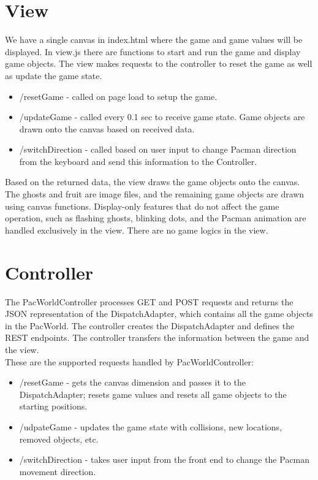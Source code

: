 \documentclass[letterpaper, 11pt]{article}
\begin{document}
\section{View}
We have a single canvas in index.html where the game and game values will be displayed. In view.js there are functions to start and run the game and display game objects. The view makes requests to the controller to reset the game as well as update the game state. 

\begin{itemize}
  \item /resetGame - called on page load to setup the game.
  \item /updateGame - called every 0.1 sec to receive game state. Game objects are drawn onto the canvas based on received data. 
  \item /switchDirection - called based on user input to change Pacman direction from the keyboard and send this information to the Controller. 
\end{itemize}

Based on the returned data, the view draws the game objects onto the canvas. The ghosts and fruit are image files, and the remaining game objects are drawn using canvas functions. Display-only features that do not affect the game operation, such as flashing ghosts, blinking dots, and the Pacman animation are handled exclusively in the view. There are no game logics in the view. 

\section{Controller}
The PacWorldController processes GET and POST requests and returns the JSON representation of the DispatchAdapter, which contains all the game objects in the PacWorld. The controller creates the DispatchAdapter and defines the REST endpoints. The controller transfers the information between the game and the view. \\ 

These are the supported requests handled by PacWorldController:
\begin{itemize}
  \item /resetGame - gets the canvas dimension and passes it to the DispatchAdapter; resets game values and resets all game objects to the starting positions.
  \item /udpateGame - updates the game state with collisions, new locations, removed objects, etc.
  \item /switchDirection - takes user input from the front end to change the Pacman movement direction.
\end{itemize}
\end{document}
